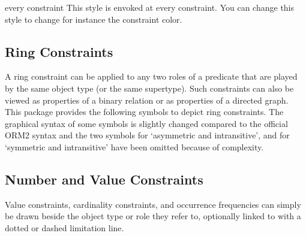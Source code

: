\documentclass[a4paper,10pt]{article}
\begin{document}
\begin{stylekey}{every constraint}
  This style is envoked at every constraint. You can change this style to change for instance the constraint color.
\end{stylekey}


\subsection{Ring Constraints}
\label{sec:ringconstraints}

A ring constraint can be applied to any two roles of a predicate that are played by the same object type (or the same supertype). Such constraints can also be viewed as properties of a binary relation or as properties of a directed graph. This package provides the following symbols to depict ring constraints. The graphical syntax of some symbols is slightly changed compared to the official ORM2 syntax and the two symbols for `asymmetric and intransitive', and for `symmetric and intransitive' have been omitted because of complexity.

\begin{codeexample}[]
\centering
{}
\end{codeexample}

\begin{codeexample}[width=2.5cm]
\end{codeexample}


\subsection{Number and Value Constraints}
Value constraints, cardinality constraints, and occurrence frequencies can simply be drawn beside the object type or role they refer to, optionally linked to with a dotted or dashed limitation line.
\end{document}
